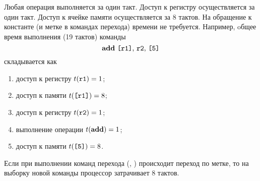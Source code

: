 Любая операция выполняется за один такт. Доступ к регистру осуществляется за один такт. Доступ к ячейке памяти осуществляется за 8 тактов. На обращение к константе (и метке в командах перехода) времени не требуется. Например, oбщее время выполнения (19 тактов) команды 
\[
    \text{\texttt{\bf{add}} {\texttt{[r1]}}, \texttt{r2}, \texttt{[5]}}
\]
складывается как
\begin{enumerate}
    \item доступ к регистру $t(\texttt{r1})=1$;
    \item доступ к памяти $t(\texttt{[r1]})=8$;
    \item доступ к регистру $t(\texttt{r2})=1$;
    \item выполнение операции $t(\texttt{\bf{add}})=1$;
    \item доступ к памяти $t(\texttt{[5]})=8$.
\end{enumerate}

Если при выполнении команд перехода (, ) происходит переход по метке, то на выборку новой команды процессор затрачивает 8 тактов.
